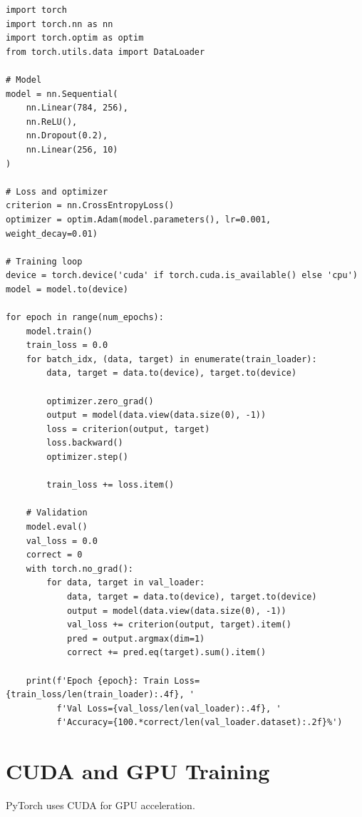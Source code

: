 \begin{code}
    \label{code:training_pytorch}
\begin{verbatim}
import torch
import torch.nn as nn
import torch.optim as optim
from torch.utils.data import DataLoader

# Model
model = nn.Sequential(
    nn.Linear(784, 256),
    nn.ReLU(),
    nn.Dropout(0.2),
    nn.Linear(256, 10)
)

# Loss and optimizer
criterion = nn.CrossEntropyLoss()
optimizer = optim.Adam(model.parameters(), lr=0.001, weight_decay=0.01)

# Training loop
device = torch.device('cuda' if torch.cuda.is_available() else 'cpu')
model = model.to(device)

for epoch in range(num_epochs):
    model.train()
    train_loss = 0.0
    for batch_idx, (data, target) in enumerate(train_loader):
        data, target = data.to(device), target.to(device)
        
        optimizer.zero_grad()
        output = model(data.view(data.size(0), -1))
        loss = criterion(output, target)
        loss.backward()
        optimizer.step()
        
        train_loss += loss.item()
    
    # Validation
    model.eval()
    val_loss = 0.0
    correct = 0
    with torch.no_grad():
        for data, target in val_loader:
            data, target = data.to(device), target.to(device)
            output = model(data.view(data.size(0), -1))
            val_loss += criterion(output, target).item()
            pred = output.argmax(dim=1)
            correct += pred.eq(target).sum().item()
    
    print(f'Epoch {epoch}: Train Loss={train_loss/len(train_loader):.4f}, '
          f'Val Loss={val_loss/len(val_loader):.4f}, '
          f'Accuracy={100.*correct/len(val_loader.dataset):.2f}%')
\end{verbatim}
\end{code}

\section{CUDA and GPU Training}

PyTorch uses CUDA for GPU acceleration.

